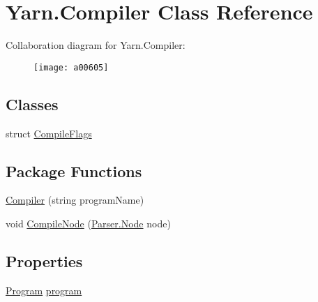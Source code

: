 \hypertarget{a00056}{\section{Yarn.\-Compiler Class Reference}
\label{a00056}
}


Collaboration diagram for Yarn.\-Compiler\-:
\nopagebreak
\begin{figure}[H]
\begin{center}
\leavevmode
\texttt{[image: a00605]}
\end{center}
\end{figure}
\subsection*{Classes}
\begin{DoxyCompactItemize}
\item 
struct \hyperlink{a00056_a00378}{Compile\-Flags}
\end{DoxyCompactItemize}
\subsection*{Package Functions}
\begin{DoxyCompactItemize}
\item 
\hyperlink{a00056_a47bfde319a618a1e11d00cb282a84364}{Compiler} (string program\-Name)
\item 
void \hyperlink{a00056_a10b52c5694f78285d087a455e3654eaa}{Compile\-Node} (\hyperlink{a00140}{Parser.\-Node} node)
\end{DoxyCompactItemize}
\subsection*{Properties}
\begin{DoxyCompactItemize}
\item 
\hyperlink{a00154}{Program} \hyperlink{a00056_aa1737da428ec7d597009661dd8a47829}{program}
\end{DoxyCompactItemize}

